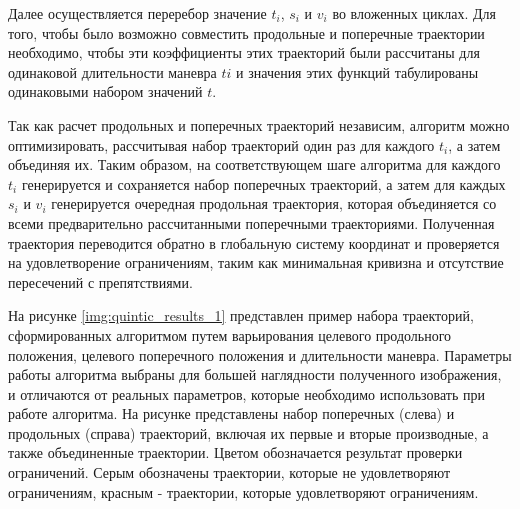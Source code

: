 Далее осуществляется переребор значение $t_i$, $s_i$ и $v_i$ во вложенных циклах. Для того, чтобы было возможно
совместить продольные и поперечные траектории необходимо, чтобы эти коэффициенты этих траекторий были рассчитаны для
одинаковой длительности маневра $ti$ и значения этих функций табулированы одинаковыми набором значений $t$.

Так как расчет продольных и поперечных траекторий независим, алгоритм можно оптимизировать, рассчитывая набор траекторий
один раз для каждого $t_i$, а затем объединяя их. Таким образом, на соответствующем шаге алгоритма для каждого $t_i$
генерируется и сохраняется набор поперечных траекторий, а затем для каждых $s_i$ и $v_i$ генерируется очередная
продольная траектория, которая объединяется со всеми предварительно рассчитанными поперечными траекториями.
Полученная траектория переводится обратно в глобальную систему координат и проверяется на удовлетворение ограничениям,
таким как минимальная кривизна и отсутствие пересечений с препятствиями.



На рисунке \ref{img:quintic_results_1} представлен пример набора траекторий, сформированных алгоритмом путем варьирования
целевого продольного положения, целевого поперечного положения и длительности маневра. Параметры работы алгоритма выбраны
для большей наглядности полученного изображения, и отличаются от реальных параметров, которые необходимо использовать
при работе алгоритма. На рисунке представлены набор поперечных (слева) и продольных (справа) траекторий, включая их
первые и вторые производные, а также объединенные траектории. Цветом обозначается результат проверки ограничений.
Серым обозначены траектории, которые не удовлетворяют ограничениям, красным - траектории, которые удовлетворяют
ограничениям.

